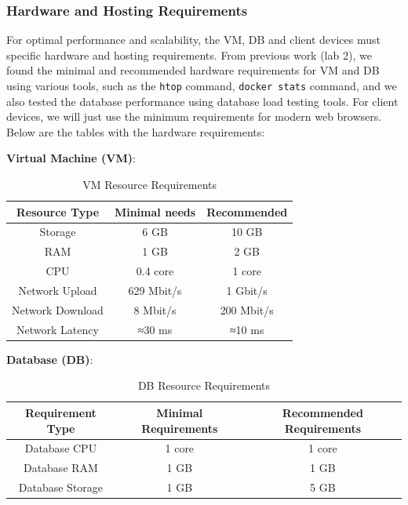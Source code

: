 \subsubsection{Hardware and Hosting Requirements}

For optimal performance and scalability, the VM, DB and client devices must
specific hardware and hosting requirements. From previous work (lab 2), we found
the minimal and recommended hardware requirements for VM and DB using various tools, such as
the \texttt{htop} command, \texttt{docker stats} command, and we also tested the
database performance using database load testing tools. For client devices, we
will just use the minimum requirements for modern web browsers.
Below are the tables with the hardware requirements:


\textbf{Virtual Machine (VM)}:

\begin{table}[H]
    \centering
    \begin{tabular}{|c|c|c|}
        \hline
        \textbf{Resource Type} & {Minimal needs} & {Recommended} \\
        \hline
        Storage                & 6 GB            & 10 GB         \\
        \hline
        RAM                    & 1 GB            & 2 GB          \\
        \hline
        CPU                    & 0.4 core        & 1 core        \\
        \hline
        Network Upload         & 629 Mbit/s      & 1 Gbit/s      \\
        \hline
        Network Download       & 8 Mbit/s        & 200 Mbit/s    \\
        \hline
        Network Latency        & ≈30 ms          & ≈10 ms        \\
        \hline
    \end{tabular}
    \caption{VM Resource Requirements}
    \label{tab:resource-types}
\end{table}


\textbf{Database (DB)}:

\begin{table}[H]
    \centering
    \begin{tabular}{|c|c|c|}
        \hline
        \textbf{Requirement Type} & \textbf{Minimal Requirements} & \textbf{Recommended Requirements} \\
        \hline
        Database CPU              & 1 core                        & 1 core                            \\
        \hline
        Database RAM              & 1 GB                          & 1 GB                              \\
        \hline
        Database Storage          & 1 GB                          & 5 GB                              \\
        \hline
    \end{tabular}
    \caption{DB Resource Requirements}
    \label{tab:system-requirements}
\end{table}



